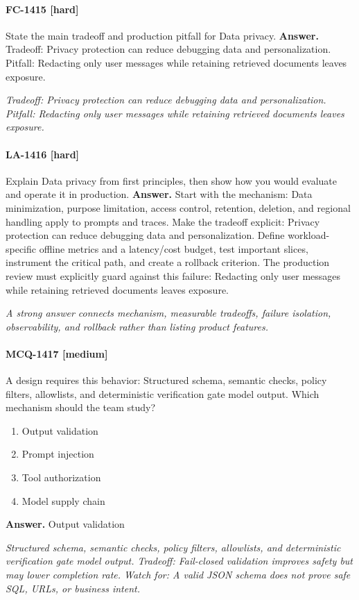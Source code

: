 \paragraph{FC-1415 [hard]} State the main tradeoff and production pitfall for Data privacy.
\noindent\textbf{Answer.} Tradeoff: Privacy protection can reduce debugging data and personalization. Pitfall: Redacting only user messages while retaining retrieved documents leaves exposure.
\par\textit{Tradeoff: Privacy protection can reduce debugging data and personalization. Pitfall: Redacting only user messages while retaining retrieved documents leaves exposure.}
\paragraph{LA-1416 [hard]} Explain Data privacy from first principles, then show how you would evaluate and operate it in production.
\noindent\textbf{Answer.} Start with the mechanism: Data minimization, purpose limitation, access control, retention, deletion, and regional handling apply to prompts and traces. Make the tradeoff explicit: Privacy protection can reduce debugging data and personalization. Define workload-specific offline metrics and a latency/cost budget, test important slices, instrument the critical path, and create a rollback criterion. The production review must explicitly guard against this failure: Redacting only user messages while retaining retrieved documents leaves exposure.
\par\textit{A strong answer connects mechanism, measurable tradeoffs, failure isolation, observability, and rollback rather than listing product features.}
\paragraph{MCQ-1417 [medium]} A design requires this behavior: Structured schema, semantic checks, policy filters, allowlists, and deterministic verification gate model output. Which mechanism should the team study?
\begin{enumerate}[label=\Alph*.]
\item Output validation
\item Prompt injection
\item Tool authorization
\item Model supply chain
\end{enumerate}
\noindent\textbf{Answer.} Output validation
\par\textit{Structured schema, semantic checks, policy filters, allowlists, and deterministic verification gate model output. Tradeoff: Fail-closed validation improves safety but may lower completion rate. Watch for: A valid JSON schema does not prove safe SQL, URLs, or business intent.}
